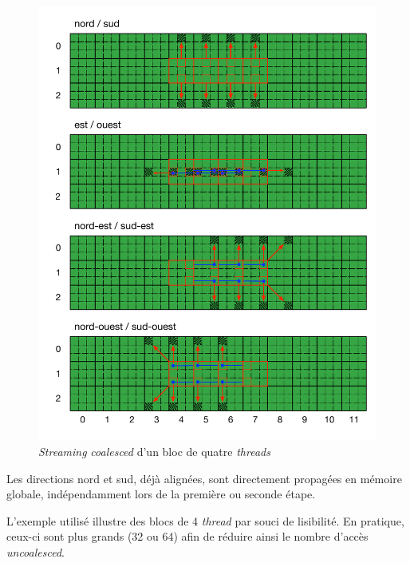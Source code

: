 \begin{figure}[H]
	\centering
	\includegraphics[fbox,scale=.7]{images/streaming/sailfish_hist_aligned.pdf}
	\caption{\textit{Streaming} \textit{coalesced} d'un bloc de quatre \textit{threads}}
	\label{fig:sailfish_hist_aligned}
\end{figure}


Les directions nord et sud, déjà alignées, sont directement propagées en mémoire globale, indépendamment lors de la première ou seconde étape.

L'exemple utilisé illustre des blocs de 4 \textit{thread} par souci de lisibilité. En pratique, ceux-ci sont plus grands (32 ou 64) afin de réduire ainsi le nombre d'accès \textit{uncoalesced}.




